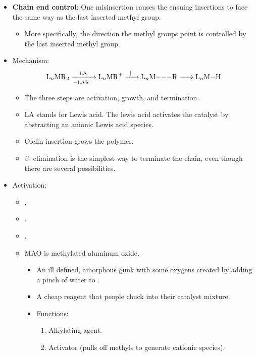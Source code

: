 \documentclass[../notes.tex]{subfiles}
\begin{document}
\begin{itemize}
\begin{itemize}
    \end{itemize}
    \item \textbf{Chain end control}: One misinsertion causes the ensuing insertions to face the same way as the last inserted methyl group.
    \begin{itemize}
        \item More specifically, the direction the methyl groups point is controlled by the last inserted methyl group.
    \end{itemize}
    \item Mechanism:
    \begin{equation*}
        \ce{L_nMR2 ->[LA][-LAR^-] L_nMR+ ->[||] L_nM---R ->[] L_nM-H}
    \end{equation*}
    \begin{itemize}
        \item The three steps are activation, growth, and termination.
        \item LA stands for Lewis acid. The lewis acid activates the catalyst by abstracting an anionic Lewis acid species.
        \item Olefin insertion grows the polymer.
        \item $\beta$- elimination is the simplest way to terminate the chain, even though there are several possibilities.
    \end{itemize}
    \item Activation:
    \begin{itemize}
        \item {}.
        \item {}.
        \item {}.
        \item MAO is methylated aluminum oxide.
        \begin{itemize}
            \item An ill defined, amorphous gunk with some oxygens created by adding a pinch of water to .
            \item A cheap reagent that people chuck into their catalyst mixture.
            \item Functions:
            \begin{enumerate}
                \item Alkylating agent.
                \item Activator (pulls off methyls to generate cationic species).

\end{enumerate}
\end{itemize}
\end{itemize}
\end{itemize}
\end{document}
